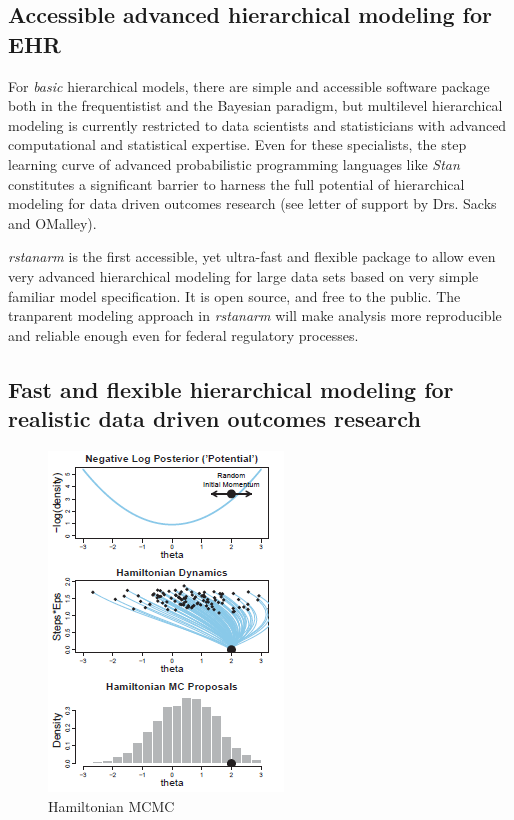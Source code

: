 \documentclass[11pt,notitlepage]{article}
\begin{document}
\subsection*{Accessible advanced hierarchical modeling for EHR}

For \textit{basic} hierarchical models, there are simple and accessible software 
package both in the frequentistist and the Bayesian paradigm, but multilevel 
hierarchical modeling is currently restricted to data scientists and statisticians 
with advanced computational and statistical expertise. Even for these specialists, 
the step learning curve of advanced probabilistic programming languages like 
\textit{Stan} constitutes a significant barrier to harness the full potential 
of hierarchical modeling for data driven outcomes research (see letter of support 
by Drs. Sacks and OMalley).

\textit{rstanarm} is the first accessible, yet ultra-fast and flexible package to 
allow even very advanced hierarchical modeling for large data sets based on very 
simple familiar model specification. It is open source, and free to the public. 
The tranparent modeling approach in \textit{rstanarm} will make analysis more 
reproducible and reliable enough even for federal regulatory processes. 

\subsection*{Fast and flexible hierarchical modeling for realistic data driven outcomes research }

\begin{figure}
  \vspace{-15pt}
 \includegraphics[scale=0.85]{Figures/Hamiltonian.png}
  \vspace{-14pt}
  \caption{Hamiltonian MCMC}
    \label{fig:Hamiltonian}
 \vspace{-16 pt}
\end{figure}
\end{document}
